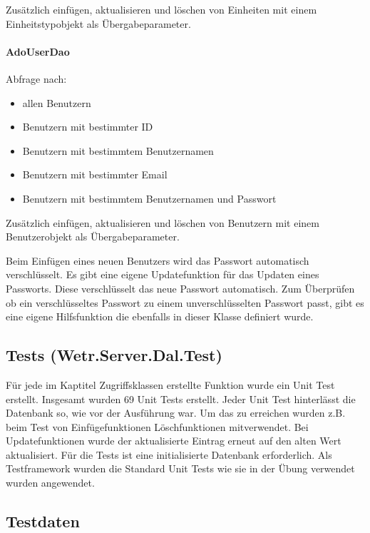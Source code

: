 Zusätzlich einfügen, aktualisieren und löschen von Einheiten mit einem
Einheitstypobjekt als Übergabeparameter.


\paragraph{AdoUserDao}\label{adouserdao}

Abfrage nach:

\begin{itemize}

\item
  allen Benutzern
\item
  Benutzern mit bestimmter ID
\item
  Benutzern mit bestimmtem Benutzernamen
\item
  Benutzern mit bestimmter Email
\item
  Benutzern mit bestimmtem Benutzernamen und Passwort
\end{itemize}

Zusätzlich einfügen, aktualisieren und löschen von Benutzern mit einem
Benutzerobjekt als Übergabeparameter.

Beim Einfügen eines neuen Benutzers wird das Passwort automatisch
verschlüsselt. Es gibt eine eigene Updatefunktion für das Updaten eines
Passworts. Diese verschlüsselt das neue Passwort automatisch. Zum
Überprüfen ob ein verschlüsseltes Passwort zu einem unverschlüsselten
Passwort passt, gibt es eine eigene Hilfsfunktion die ebenfalls in
dieser Klasse definiert wurde.


\subsection{Tests
(Wetr.Server.Dal.Test)}\label{tests-wetr.server.dal.test}

Für jede im Kaptitel Zugriffsklassen erstellte Funktion wurde ein Unit
Test erstellt. Insgesamt wurden 69 Unit Tests erstellt. Jeder Unit Test
hinterlässt die Datenbank so, wie vor der Ausführung war. Um das zu
erreichen wurden z.B. beim Test von Einfügefunktionen Löschfunktionen
mitverwendet. Bei Updatefunktionen wurde der aktualisierte Eintrag
erneut auf den alten Wert aktualisiert. Für die Tests ist eine
initialisierte Datenbank erforderlich. Als Testframework wurden die
Standard Unit Tests wie sie in der Übung verwendet wurden angewendet.


\subsection{Testdaten}\label{testdaten}


